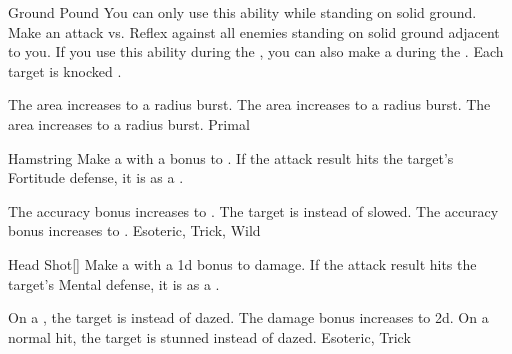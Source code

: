 \lowercase{\hypertarget{maneuver:Ground Pound}{}}\label{maneuver:Ground Pound}
\begin{apability}{\hypertarget{maneuver:Ground Pound}{Ground Pound}}
You can only use this ability while standing on solid ground.
Make an attack vs. Reflex against all enemies standing on solid ground adjacent to you.
If you use this ability during the , you can also make a  during the .
\hit Each target is knocked \prone.

\rankline
{} The area increases to a \areamed radius burst.
 The area increases to a \arealarge radius burst.
 The area increases to a \areahuge radius burst.
 Primal
\end{apability}
\vspace{0.25em}



\lowercase{\hypertarget{maneuver:Hamstring}{}}\label{maneuver:Hamstring}
\begin{apability}{\hypertarget{maneuver:Hamstring}{Hamstring}}
Make a  with a  bonus to .
If the attack result hits the target's Fortitude defense,
it is  as a .

\rankline
{} The accuracy bonus increases to .
 The target is  instead of slowed.
 The accuracy bonus increases to .
 Esoteric, Trick, Wild
\end{apability}
\vspace{0.25em}



\lowercase{\hypertarget{maneuver:Head Shot}{}}\label{maneuver:Head Shot}
\begin{apability}{\hypertarget{maneuver:Head Shot}{Head Shot}}[]
Make a  with a \plus1d bonus to damage.
If the attack result hits the target's Mental defense,
it is  as a .

\rankline
{} On a , the target is  instead of dazed.
 The damage bonus increases to \plus2d.
 On a normal hit, the target is stunned instead of dazed.
 Esoteric, Trick
\end{apability}
\vspace{0.25em}



